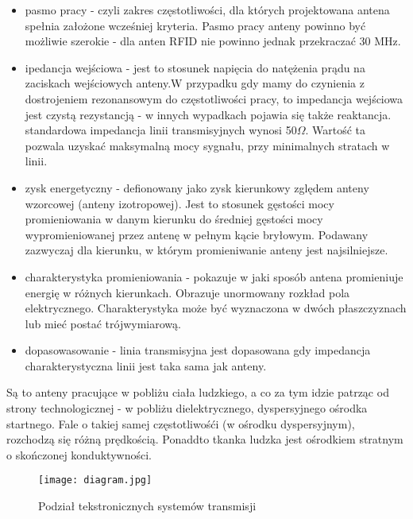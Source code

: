 \begin{itemize}\setlength{\itemsep}{0pt}

	\item pasmo pracy - czyli zakres częstotliwości, dla których projektowana antena spełnia założone wcześniej kryteria. Pasmo pracy anteny powinno być możliwie szerokie - dla anten RFID nie powinno jednak przekraczać 30 MHz. 

	\item ipedancja wejściowa - jest to stosunek napięcia do natężenia prądu na zaciskach wejściowych anteny.W przypadku gdy mamy do czynienia z dostrojeniem rezonansowym do częstotliwości pracy, to impedancja wejściowa jest czystą rezystancją - w innych wypadkach pojawia się także reaktancja.
	standardowa impedancja linii transmisyjnych wynosi 50\(\Omega\). Wartość ta pozwala uzyskać maksymalną mocy sygnału, przy minimalnych stratach w linii.

	\item zysk energetyczny - defionowany jako zysk kierunkowy zględem anteny wzorcowej (anteny izotropowej).
	Jest to stosunek gęstości mocy promieniowania w danym kierunku do średniej gęstości mocy wypromieniowanej przez antenę w pełnym kącie bryłowym. Podawany zazwyczaj dla kierunku, w którym promieniwanie anteny jest najsilniejsze.  

	\item charakterystyka promieniowania - pokazuje w jaki sposób antena promieniuje energię w różnych kierunkach. Obrazuje unormowany rozkład pola elektrycznego. Charakterystyka może być wyznaczona w dwóch płaszczyznach lub mieć postać trójwymiarową.

	\item dopasowasowanie - linia transmisyjna jest dopasowana gdy impedancja charakterystyczna linii jest taka sama jak anteny. 


\end{itemize}

Są to anteny pracujące w pobliżu ciała ludzkiego, a co za tym idzie patrząc od strony technologicznej - w pobliżu dielektrycznego, dyspersyjnego ośrodka startnego. Fale o takiej samej częstotliwośći (w ośrodku dyspersyjnym), rozchodzą się różną prędkością. 
Ponaddto tkanka ludzka jest ośrodkiem stratnym o skończonej konduktywności.

	\begin{figure}[h!]
	\centering
	    \texttt{[image: diagram.jpg]}
	    \caption{Podział tekstronicznych systemów transmisji}
	\end{figure}


